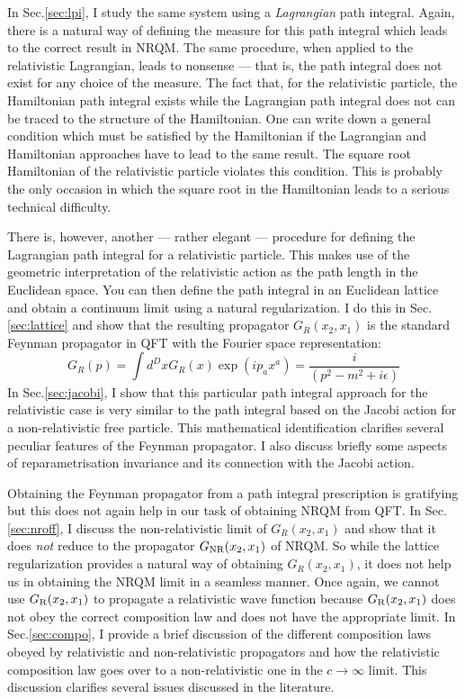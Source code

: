 \documentclass{article}
\begin{document}
 In Sec.\ref{sec:lpi}, I study the same system using a \textit{Lagrangian} path integral. Again, there is a natural way of defining the measure for this path integral which leads to the correct result in NRQM. The same procedure, when applied to the relativistic Lagrangian, leads to nonsense --- that is, the path integral does not exist for any choice of the measure. The fact that, for the relativistic particle,  the Hamiltonian path integral exists while the Lagrangian path integral does not can be traced to the structure of the Hamiltonian. One can write down a general condition which must be satisfied by the Hamiltonian if the Lagrangian and Hamiltonian approaches have to lead to the same result. The square root Hamiltonian of the relativistic particle violates this condition. This is probably the only occasion in which the square root in the Hamiltonian leads to a serious technical difficulty. 
 
 There is, however, another --- rather elegant --- procedure for defining the Lagrangian path integral for a relativistic particle. This makes use of the geometric interpretation of the relativistic action as the path length in the Euclidean space. You can then define the path integral in an Euclidean lattice and obtain a continuum limit using a natural regularization.  I do this in Sec.\ref{sec:lattice} and show that the resulting propagator $G_R(x_2,x_1)$ is the standard Feynman propagator in QFT with the Fourier space representation:
 \begin{equation}
G_R(p)=\int d^Dx G_R(x)\exp(i p_ax^a)=\frac{i}{(p^2-m^2+i\epsilon)}                                                                 
\end{equation} 
In Sec.\ref{sec:jacobi}, I show that this particular path integral approach for the relativistic case is very similar to the path integral based on the Jacobi action for  a non-relativistic free particle. This mathematical identification clarifies several peculiar features of the Feynman propagator.
 I also discuss briefly some aspects of reparametrisation invariance and its connection with the Jacobi action. 
 
 Obtaining the Feynman propagator from a path integral prescription is gratifying but this does not again help in our task of obtaining NRQM from QFT.
 In Sec.\ref{sec:nroff}, I discuss the non-relativistic limit of $G_R(x_2,x_1)$ and show that it does \textit{not} reduce to the propagator $G_{\rm NR}(x_2,x_1)$ of NRQM. So while the lattice regularization provides a natural way of obtaining $G_R(x_2,x_1)$, it does not help us in obtaining the NRQM limit in a seamless manner.
 Once again, we cannot use $G_{\rm R}(x_2,x_1)$ to propagate a relativistic wave function because $G_{\rm R}(x_2,x_1)$ does not obey the correct composition law and does not have the appropriate limit.
 In Sec.\ref{sec:compo}, I provide a brief discussion of the different composition laws obeyed by relativistic and non-relativistic propagators and how the relativistic composition law goes over to a non-relativistic one in the $c\to\infty$ limit. This discussion clarifies several issues discussed in the literature. 
 
\end{document}
